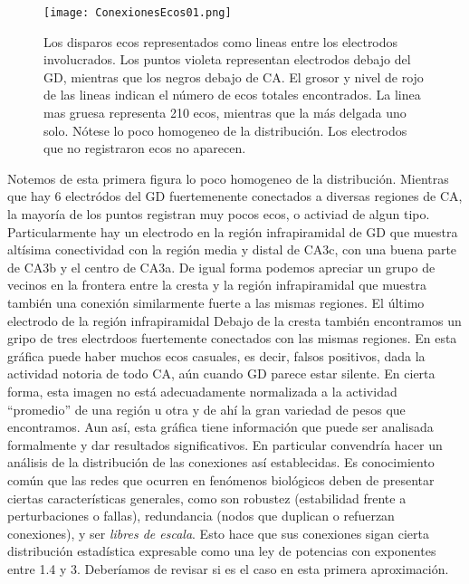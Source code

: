 \documentclass{article}
\begin{document}
\begin{figure}[h]
\centering
\texttt{[image: ConexionesEcos01.png]}
\caption{ Los disparos ecos representados como lineas entre
los electrodos involucrados. Los puntos violeta representan 
electrodos debajo del GD, mientras que los negros
debajo de CA. El grosor y nivel de rojo de las lineas indican
el número de ecos totales encontrados. La linea mas gruesa
representa 210 ecos, mientras que la más delgada uno solo. 
Nótese lo poco homogeneo de la distribución. Los electrodos
que no registraron ecos no aparecen. 
}\label{EcosTotales}
\end{figure}

Notemos de esta primera figura lo poco homogeneo de la distribución.
Mientras que hay 6 electródos del GD fuertemenente conectados
a diversas regiones de CA, la mayoría de los puntos registran muy pocos
ecos, o activiad de algun tipo. Particularmente hay un electrodo en
la región infrapiramidal de GD que muestra altísima conectividad con
la región media y distal de CA3c, con una buena parte de CA3b y el
centro de CA3a. De igual forma podemos apreciar un grupo de vecinos
en la frontera entre la cresta y la región infrapiramidal que
muestra también una conexión similarmente fuerte a 
las mismas regiones. El último electrodo de la región infrapiramidal
Debajo de la cresta también encontramos un gripo de tres electrdoos
fuertemente conectados con las mismas regiones. En esta gráfica
puede haber muchos ecos casuales, es decir, falsos positivos,
dada la actividad notoria de todo CA, aún cuando GD parece 
estar silente. En cierta forma, esta imagen no está adecuadamente
normalizada a la actividad ``promedio'' de una región u otra y
de ahí la gran variedad de pesos que encontramos. Aun así, esta
gráfica tiene información que puede ser analisada formalmente y
dar resultados significativos. En particular convendría 
hacer un análisis de la distribución de las conexiones así establecidas.
Es conocimiento común que las redes que ocurren en fenómenos biológicos
deben de presentar ciertas características generales, como son 
robustez (estabilidad frente a perturbaciones o fallas), redundancia
(nodos que duplican o refuerzan conexiones), y ser \emph{libres de escala}.
Esto hace que sus conexiones sigan cierta distribución estadística
expresable como una ley de potencias con exponentes entre 1.4 y 3.
Deberíamos de revisar si es el caso en esta primera aproximación. 
\end{document}
